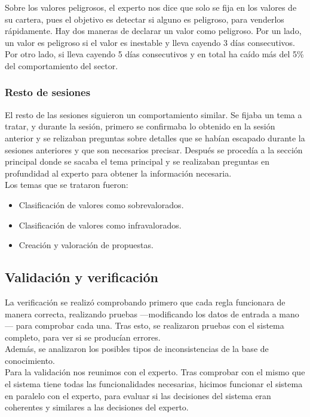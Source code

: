 Sobre los valores peligrosos, el experto nos dice que solo se fija en los valores de su cartera, pues el objetivo es detectar si alguno es peligroso, para venderlos rápidamente. Hay dos maneras de declarar un valor como peligroso. Por un lado, un valor es peligroso si el valor es inestable y lleva cayendo 3 días consecutivos. Por otro lado, si lleva cayendo 5 días consecutivos y en total ha caído más del 5\% del comportamiento del sector.

\subsubsection{Resto de sesiones}

El resto de las sesiones siguieron un comportamiento similar. Se fijaba un tema a tratar, y durante la sesión, primero se confirmaba lo obtenido en la sesión anterior y se relizaban preguntas sobre detalles que se habían escapado durante la sesiones anteriores y que son necesarios precisar. Después se procedía a la sección principal donde se sacaba el tema principal y se realizaban preguntas en profundidad al experto para obtener la información necesaria.\\

Los temas que se trataron fueron:
\begin{itemize}
\item Clasificación de valores como sobrevalorados.
\item Clasificación de valores como infravalorados.
\item Creación y valoración de propuestas.
\end{itemize}

\subsection{Validación y verificación}

La verificación se realizó comprobando primero que cada regla funcionara de manera correcta, realizando pruebas ---modificando los datos de entrada a mano--- para comprobar cada una. Tras esto, se realizaron pruebas con el sistema completo, para ver si se producían errores.\\

Además, se analizaron los posibles tipos de inconsistencias de la base de conocimiento.\\

Para la validación nos reunimos con el experto. Tras comprobar con el mismo que el sistema tiene todas las funcionalidades necesarias, hicimos funcionar el sistema en paralelo con el experto, para evaluar si las decisiones del sistema eran coherentes y similares a las decisiones del experto.\\

